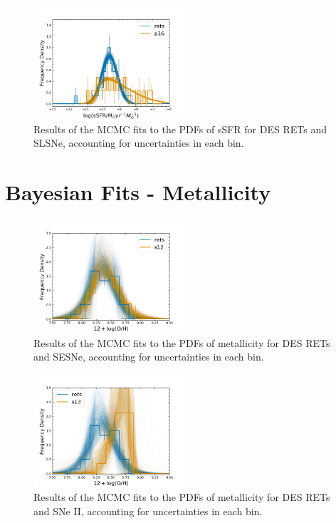 \documentclass[fleqn,usenatbib,]{mnras}
\begin{document}
\begin{figure}
\includegraphics[width=0.5\textwidth]{mc_figs/rets_p16_histfit_ssfr_final.png}
\caption{Results of the MCMC fits to the PDFs of sSFR for DES RETs and SLSNe, accounting for uncertainties in each bin.
\label{fig:histfit}}
\end{figure}

\section{Bayesian Fits - Metallicity}
\label{app:c}

\begin{figure}
\includegraphics[width=0.5\textwidth]{mc_figs/rets_s12_OH_histfit_final.png}
\caption{Results of the MCMC fits to the PDFs of metallicity for DES RETs and SESNe, accounting for uncertainties in each bin.
\label{fig:histfit}}
\end{figure}

\begin{figure}
\includegraphics[width=0.5\textwidth]{mc_figs/rets_s13_OH_histfit_final.png}
\caption{Results of the MCMC fits to the PDFs of metallicity for DES RETs and SNe II, accounting for uncertainties in each bin.
\label{fig:histfit}}
\end{figure}
\end{document}

